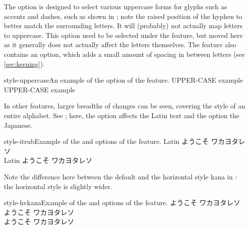 \documentclass[a4paper]{l3doc}
\begin{document}
The  option is designed to select various
uppercase forms for glyphs such as accents and dashes, such as shown
in ; note the raised position of the hyphen
to better match the surrounding letters.
It will (probably) not actually map letters to uppercase.
This option used to be selected under the  feature, but moved here
as it generally does not actually affect the letters themselves.
The  feature also contains an  option,
which adds a small amount of spacing in between letters (see \vref{sec:kerning}).

\begin{Lexample}{style-uppercase}{An example of the  option of the  feature.}
   UPPER-CASE example \\
   UPPER-CASE example
\end{Lexample}


In other features, larger breadths of changes can be seen, covering
the style of an entire alphabet.
See ; here, the  option affects the Latin text
and the  option the Japanese.

\begin{Xexample}[firstline=2]{style-itrub}{Example of the  and  options of the  feature.}
  \Large \def\kana{ようこそ ワカヨタレソ}
   Latin \kana        \\
   Latin \kana
\end{Xexample}

Note the difference here between the default and the horizontal style kana
in : the horizontal style is slightly wider.

\begin{Xexample}[firstline=2]{style-hvkana}{Example of the  and  options of the  feature.}
  \Large \def\kana{ようこそ ワカヨタレソ}
    \kana   \\
  {
    \kana } \\
  {
    \kana }
\end{Xexample}
\end{document}
